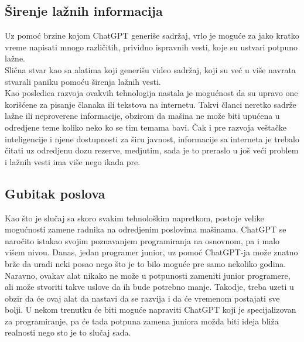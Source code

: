 \documentclass[fleqn, 12pt]{article}
\begin{document}
    \subsection{Širenje lažnih informacija}
        \begin{text}
            Uz pomoć brzine kojom ChatGPT generiše sadržaj, vrlo je moguće za jako kratko vreme napisati mnogo različitih, prividno ispravnih vesti, koje su ustvari potpuno lažne.\cite{G8}
            \\
            Slična stvar kao sa alatima koji generišu video sadržaj, koji su već u više navrata stvarali paniku pomoću širenja lažnih vesti.\cite{G8}
            \\
            Kao posledica razvoja ovakvih tehnologija nastala je mogućnost da su upravo one korišćene za pisanje članaka ili tekstova na internetu. Takvi članci neretko sadrže lažne ili neproverene informacije, obzirom da mašina ne može biti upućena u odredjene teme koliko neko ko se tim temama bavi. Čak i pre razvoja veštačke inteligencije i njene dostupnosti za širu javnost, informacije sa interneta je trebalo čitati uz odredjenu dozu rezerve, medjutim, sada je to preraslo u još veći problem i lažnih vesti ima više nego ikada pre.\cite{G8}
        \end{text}

    \subsection{Gubitak poslova}
        \begin{text}
            Kao što je slučaj sa skoro svakim tehnološkim napretkom, postoje velike mogućnosti zamene radnika na odredjenim poslovima mašinama. ChatGPT se naročito istakao svojim poznavanjem programiranja na osnovnom, pa i malo višem nivou. Danas, jedan programer junior, uz pomoć ChatGPT-ja može znatno brže da uradi neki posao nego što je to bilo moguće pre samo nekoliko godina. Naravno, ovakav alat nikako ne može u potpunosti zameniti junior programere, ali može stvoriti takve uslove da ih bude potrebno manje. Takodje, treba uzeti u obzir da će ovaj alat da nastavi da se razvija i da će vremenom postajati sve bolji. U nekom trenutku će biti moguće napraviti ChatGPT koji je specijalizovan za programiranje, pa će tada potpuna zamena juniora možda biti ideja bliža realnosti nego sto je to slučaj sada. \cite{G6}
        \end{text}
\end{document}
